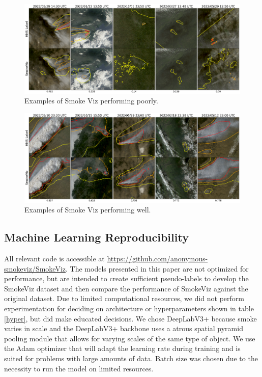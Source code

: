 \documentclass{article}
\begin{document}
\begin{figure}[!htb]
    \centering
    \includegraphics[width=\linewidth]{stat_figs/bad_results.png}
    \caption{Examples of Smoke Viz performing poorly.}
    \label{poor}
\end{figure}


\begin{figure}[!htb]
    \centering
    \includegraphics[width=\linewidth]{stat_figs/good_results.png}
    \caption{Examples of Smoke Viz performing well.}
    \label{good}
\end{figure}


\subsection{Machine Learning Reproducibility}

All relevant code is accessible at \url{https://github.com/anonymous-smokeviz/SmokeViz}. The models presented in this paper are not optimized for performance, but are intended to create sufficient pseudo-labels to develop the SmokeViz dataset and then compare the performance of SmokeViz against the original dataset. Due to limited computational resources, we did not perform experimentation for deciding on architecture or hyperparameters shown in table \ref{hyper}, but did make educated decisions. We chose DeepLabV3+ because smoke varies in scale and the DeepLabV3+ backbone uses a atrous spatial pyramid pooling module that allows for varying scales of the same type of object. We use the Adam optimizer that will adapt the learning rate during training and is suited for problems with large amounts of data. Batch size was chosen due to the necessity to run the model on limited resources. 
\end{document}
